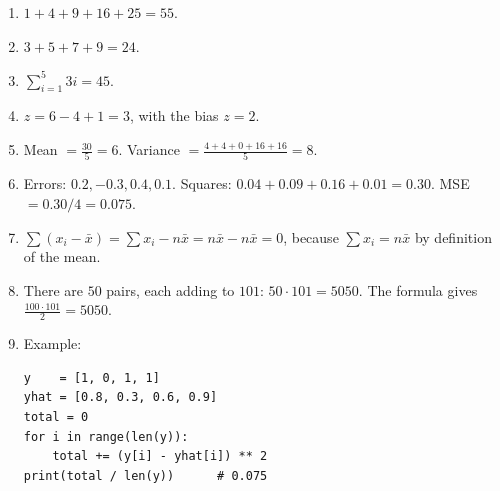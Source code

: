 \begin{enumerate}[label=\textbf{\ansnum.\arabic*}]
  \item $1+4+9+16+25=55$.
  \item $3+5+7+9=24$.
  \item $\displaystyle\sum_{i=1}^5 3i=45$.
  \item $z=6-4+1=3$, with the bias $z=2$.
  \item Mean $=\frac{30}{5}=6$. Variance $=\frac{4+4+0+16+16}{5}=8$.
  \item Errors: $0.2,-0.3,0.4,0.1$. Squares: $0.04+0.09+0.16+0.01=0.30$. MSE $=0.30/4=0.075$.
  \item $\sum(x_i-\bar x)=\sum x_i-n\bar x=n\bar x-n\bar x=0$, because $\sum x_i=n\bar x$ by definition of the mean.
  \item There are $50$ pairs, each adding to $101$: $50\cdot101=5050$. The formula gives $\frac{100\cdot101}{2}=5050$.
  \item Example:
\begin{verbatim}
y    = [1, 0, 1, 1]
yhat = [0.8, 0.3, 0.6, 0.9]
total = 0
for i in range(len(y)):
    total += (y[i] - yhat[i]) ** 2
print(total / len(y))      # 0.075
\end{verbatim}
\end{enumerate}

